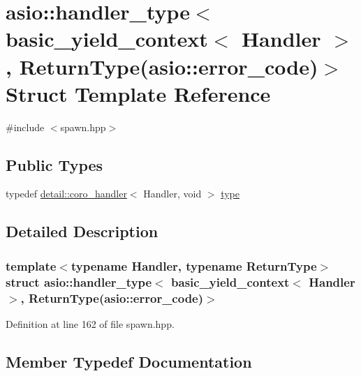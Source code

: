 \hypertarget{structasio_1_1handler__type_3_01basic__yield__context_3_01_handler_01_4_00_01_01_01_01_01_01_01_4293f21a96d71a94577a209dcb83a1de}{}\section{asio\+:\+:handler\+\_\+type$<$ basic\+\_\+yield\+\_\+context$<$ Handler $>$, Return\+Type(asio\+:\+:error\+\_\+code)$>$ Struct Template Reference}
\label{structasio_1_1handler__type_3_01basic__yield__context_3_01_handler_01_4_00_01_01_01_01_01_01_01_4293f21a96d71a94577a209dcb83a1de}


{\ttfamily \#include $<$spawn.\+hpp$>$}

\subsection*{Public Types}
\begin{DoxyCompactItemize}
\item 
typedef \hyperlink{classasio_1_1detail_1_1coro__handler}{detail\+::coro\+\_\+handler}$<$ Handler, void $>$ \hyperlink{structasio_1_1handler__type_3_01basic__yield__context_3_01_handler_01_4_00_01_01_01_01_01_01_01_4293f21a96d71a94577a209dcb83a1de_ac76d9787a62f2c5d51878a825a6fa194}{type}
\end{DoxyCompactItemize}


\subsection{Detailed Description}
\subsubsection*{template$<$typename Handler, typename Return\+Type$>$struct asio\+::handler\+\_\+type$<$ basic\+\_\+yield\+\_\+context$<$ Handler $>$,           Return\+Type(asio\+::error\+\_\+code)$>$}



Definition at line 162 of file spawn.\+hpp.



\subsection{Member Typedef Documentation}
\hypertarget{structasio_1_1handler__type_3_01basic__yield__context_3_01_handler_01_4_00_01_01_01_01_01_01_01_4293f21a96d71a94577a209dcb83a1de_ac76d9787a62f2c5d51878a825a6fa194}{}
